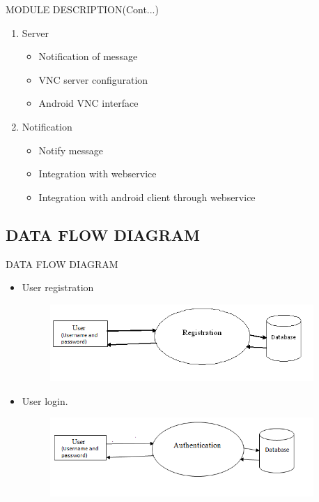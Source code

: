   \begin{frame}{MODULE DESCRIPTION(Cont...)}
   \begin{enumerate}
   \item Server
   \begin{itemize}
  \item Notification of message
  \item VNC server configuration
  \item Android VNC interface
  \end{itemize}
  
   \item Notification
   \begin{itemize}
  \item Notify message
  \item Integration with webservice
  \item Integration with android client through webservice
  \end{itemize}
   \end{enumerate}
 \end{frame} 
 
 
\subsection{DATA FLOW DIAGRAM}
\begin{frame}{DATA FLOW DIAGRAM}
   \begin{itemize}
  \item User registration
  \begin{figure}[ht!]
    \centering
    \includegraphics[width=10cm]{login1.png}
    
    \label{fig:pc control reg}
\end{figure}

  \item User login.
   
   \begin{figure}[ht!]
    \centering
    \includegraphics[width=10cm]{login2.png}
    
    \label{fig:pc control login}
\end{figure}
 
\end{itemize}

 \end{frame}


